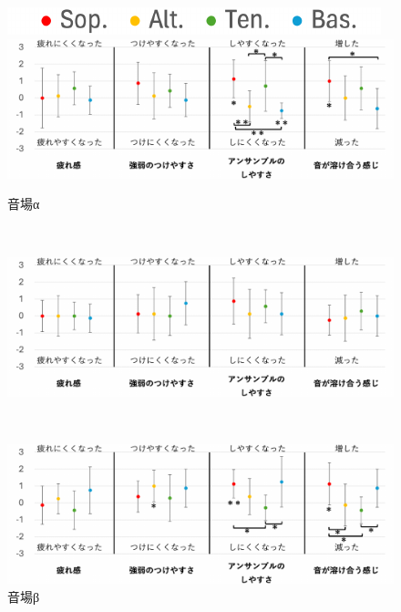 \documentclass[11pt,a4j]{jreport}
\begin{document}
\newpage
\begin{figure}[H]
  \centering
  
  \begin{minipage}{1\linewidth}
    \centering
    \includegraphics[scale=.55]{images/subjectiveExp/statisticAnalysis/part_legend.pdf}
  \end{minipage}
  \vspace{.5\baselineskip}

  \begin{minipage}{1\linewidth}
    \centering
    \includegraphics[scale=.55]{images/subjectiveExp/statisticAnalysis/part_performance_a.pdf}
    \caption*{音場α}
    \label{fig:演奏の印象α}
  \end{minipage}
  \\
  \vspace{1\baselineskip}
  \begin{minipage}{1\linewidth}
    \centering
    \includegraphics[scale=.55]{images/subjectiveExp/statisticAnalysis/part_performance_b.pdf}
    \caption*{音場β}
    \label{fig:演奏の印象β}
  \end{minipage}
  \\
  \vspace{1\baselineskip}
  \begin{minipage}{1\linewidth}
    \centering
    \includegraphics[scale=.55]{images/subjectiveExp/statisticAnalysis/part_performance_c.pdf}

\end{minipage}
\end{figure}
\end{document}
